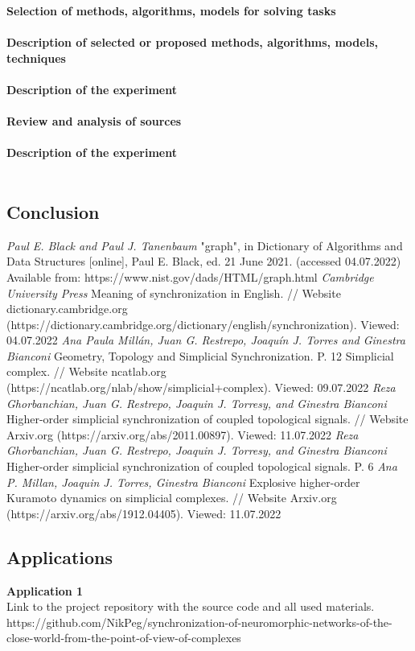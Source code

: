 \documentclass[draft]{article}
\newcommand\zz[1]{\par{\normalsize\strut #1} \hfill\ignorespaces}
\begin{document}
\textbf{Selection of methods, algorithms, models for solving tasks}\\
~\\
\textbf{Description of selected or proposed methods, algorithms, models, techniques}\\
~\\
\textbf{Description of the experiment}\\
~\\
\textbf{Review and analysis of sources}\\
~\\
\textbf{Description of the experiment}\\
~\\

\newpage
\begin{center}
\section {Conclusion}
\end{center}

\newpage
\begin{center}
\begin{thebibliography}{}
 \textit{Paul E. Black and Paul J. Tanenbaum} "graph", in Dictionary of Algorithms and Data Structures [online], Paul E. Black, ed. 21 June 2021. (accessed 04.07.2022) Available from: https://www.nist.gov/dads/HTML/graph.html
 \textit{Cambridge University Press} Meaning of synchronization in English. // Website dictionary.cambridge.org (https://dictionary.cambridge.org/dictionary/english/synchronization). Viewed: 04.07.2022
 \textit{Ana Paula Millán, Juan G. Restrepo, Joaquín J. Torres and Ginestra Bianconi} Geometry, Topology and Simplicial Synchronization. P. 12
 Simplicial complex. // Website ncatlab.org (https://ncatlab.org/nlab/show/simplicial+complex). Viewed: 09.07.2022
 \textit{Reza Ghorbanchian, Juan G. Restrepo, Joaquin J. Torresy, and Ginestra Bianconi} Higher-order simplicial synchronization of coupled topological signals. // Website Arxiv.org (https://arxiv.org/abs/2011.00897). Viewed: 11.07.2022
 \textit{Reza Ghorbanchian, Juan G. Restrepo, Joaquin J. Torresy, and Ginestra Bianconi} Higher-order simplicial synchronization of coupled topological signals. P. 6
 \textit{Ana P. Millan, Joaquin J. Torres,  Ginestra Bianconi} Explosive higher-order Kuramoto dynamics on simplicial complexes. // Website Arxiv.org (https://arxiv.org/abs/1912.04405). Viewed: 11.07.2022
\end{thebibliography}
\end{center}
\newpage
\begin{center}
\section {Applications}
\end{center}
\zz{}\textbf{Application 1\\}
Link to the project repository with the source code and all used materials.\\
https://github.com/NikPeg/synchronization-of-neuromorphic-networks-of-the-close-world-from-the-point-of-view-of-complexes\\
\end{document}

